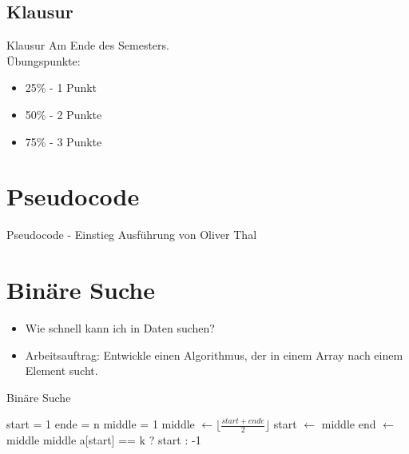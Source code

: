 \documentclass[18pt]{beamer}
\begin{document}
\subsection{Klausur}
\begin{frame}{Klausur}
 Am Ende des Semesters. \\
 Übungspunkte:
 \begin{itemize}
  \item 25\% - 1 Punkt
  \item 50\% - 2 Punkte
  \item 75\% - 3 Punkte
 \end{itemize}

\end{frame}


\section{Pseudocode}
\begin{frame}{Pseudocode - Einstieg}
 Ausführung von Oliver Thal
\end{frame}

\section{Binäre Suche}
\begin{frame}
 \begin{itemize}
  \item Wie schnell kann ich in Daten suchen?
  \item Arbeitsauftrag: Entwickle einen Algorithmus, der in einem Array nach einem Element sucht.
 \end{itemize}

\end{frame}

\begin{frame}[fragile]{Binäre Suche}
 \begin{algorithmic}
    \State start = 1
    \State ende = n
    \State middle = 1
      \State middle $\gets\lfloor \frac{start + ende}{2} \rfloor$
	\State start $\gets$ middle
        \State end $\gets$ middle
      \Else
        \State \Return middle
      \EndIf
    \EndWhile
    \State \Return a[start] == k ? start : -1
  \EndFunction
 \end{algorithmic}
\end{frame}
\end{document}
